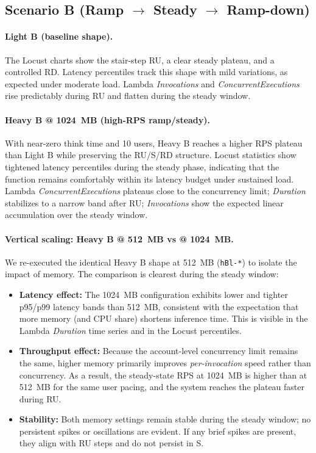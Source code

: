 \documentclass[11pt,a4paper]{article}
\begin{document}
\subsection{Scenario B (Ramp $\rightarrow$ Steady $\rightarrow$ Ramp-down)}\label{subsec:resB}

\paragraph{Light B (baseline shape).}
The Locust charts show the stair-step RU, a clear steady plateau, and a controlled RD. Latency percentiles track this shape with mild variations, as expected under moderate load. Lambda \emph{Invocations} and \emph{ConcurrentExecutions} rise predictably during RU and flatten during the steady window.

\paragraph{Heavy B @ \SI{1024}{MB} (high-RPS ramp/steady).}
With near-zero think time and 10 users, Heavy B reaches a higher RPS plateau than Light B while preserving the RU/S/RD structure. Locust statistics show tightened latency percentiles during the steady phase, indicating that the function remains comfortably within its latency budget under sustained load. Lambda \emph{ConcurrentExecutions} plateaus close to the concurrency limit; \emph{Duration} stabilizes to a narrow band after RU; \emph{Invocations} show the expected linear accumulation over the steady window.

\paragraph{Vertical scaling: Heavy B @ \SI{512}{MB} vs @ \SI{1024}{MB}.}
We re-executed the identical Heavy B shape at \SI{512}{MB} (\texttt{hBl-*}) to isolate the impact of memory. The comparison is clearest during the steady window:
\begin{itemize}
  \item \textbf{Latency effect:} The \SI{1024}{MB} configuration exhibits lower and tighter p95/p99 latency bands than \SI{512}{MB}, consistent with the expectation that more memory (and CPU share) shortens inference time. This is visible in the Lambda \emph{Duration} time series and in the Locust percentiles.
  \item \textbf{Throughput effect:} Because the account-level concurrency limit remains the same, higher memory primarily improves \emph{per-invocation} speed rather than concurrency. As a result, the steady-state RPS at \SI{1024}{MB} is higher than at \SI{512}{MB} for the same user pacing, and the system reaches the plateau faster during RU.
  \item \textbf{Stability:} Both memory settings remain stable during the steady window; no persistent spikes or oscillations are evident. If any brief spikes are present, they align with RU steps and do not persist in S.
\end{itemize}
\end{document}
